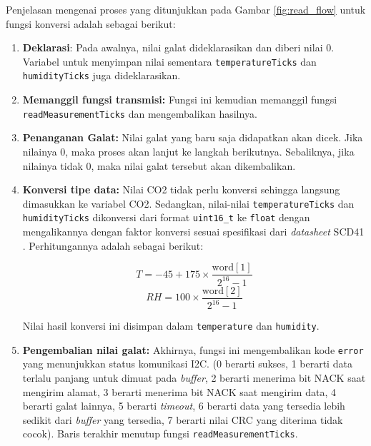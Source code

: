         Penjelasan mengenai proses yang ditunjukkan pada Gambar \ref{fig:read_flow} untuk fungsi konversi adalah sebagai berikut:

        \begin{enumerate}
        
            \item \textbf{Deklarasi}: Pada awalnya, nilai galat dideklarasikan dan diberi nilai 0. Variabel untuk menyimpan nilai sementara \texttt{temperatureTicks} dan \texttt{humidityTicks} juga dideklarasikan.
            
            \item \textbf{Memanggil fungsi transmisi: }Fungsi ini kemudian memanggil fungsi \\ \texttt{readMeasurementTicks} dan mengembalikan hasilnya.
            
            \item \textbf{Penanganan Galat:} Nilai galat yang baru saja didapatkan akan dicek. Jika nilainya 0, maka proses akan lanjut ke langkah berikutnya. Sebaliknya, jika nilainya tidak 0, maka nilai galat tersebut akan dikembalikan. 
            
            \item \textbf{Konversi tipe data:} Nilai CO2 tidak perlu konversi sehingga langsung dimasukkan ke variabel CO2. Sedangkan, nilai-nilai \texttt{temperatureTicks} dan \texttt{humidityTicks} dikonversi dari format \texttt{uint16\_t} ke \texttt{float} dengan mengalikannya dengan faktor konversi sesuai spesifikasi dari \textit{datasheet} SCD41 \cite{scd4x_datasheet}. Perhitungannya adalah sebagai berikut:  

            \[ T = -45 + 175 \times \frac{\text{word}[1]}{2^{16} - 1} \]
            \[ RH = 100 \times \frac{\text{word}[2]}{2^{16} - 1} \]

            Nilai hasil konversi ini disimpan dalam \texttt{temperature} dan \texttt{humidity}.

            \item \textbf{Pengembalian nilai galat:} Akhirnya, fungsi ini mengembalikan kode \texttt{error} yang menunjukkan status komunikasi I2C. (0 berarti sukses, 1 berarti data terlalu panjang untuk dimuat pada \textit{buffer}, 2 berarti menerima bit NACK saat mengirim alamat, 3 berarti menerima bit NACK saat mengirim data, 4 berarti galat lainnya, 5 berarti \textit{timeout}, 6 berarti data yang tersedia lebih sedikit dari \textit{buffer} yang tersedia, 7 berarti nilai CRC yang diterima tidak cocok). Baris terakhir menutup fungsi \texttt{readMeasurementTicks}.
            
        \end{enumerate}
        
